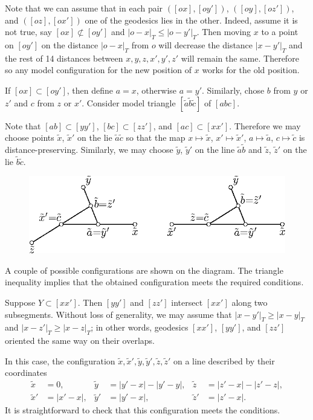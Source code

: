 \documentclass{article}
\begin{document}
Note that we can assume that in each pair $([ox],[oy'])$, $([oy],[oz'])$, and $([oz],[ox'])$ one of the geodesics lies in the other.
Indeed, assume it is not true, say $[ox]\not\subset[oy']$ and $|o-x|_T\le |o-y'|_T$.
Then moving $x$ to a point on $[oy']$ on the distance $|o-x|_T$ from $o$ will decrease the distance $|x-y'|_T$ and the rest of 14 distances between $x,y,z,x',y',z'$ will remain the same.
Therefore so any model configuration for the new position of $x$ works for the old position.

If $[ox]\subset [oy']$, then define $a=x$, otherwise $a=y'$.
Similarly, chose  $b$ from $y$ or $z'$ and $c$ from $z$ or $x'$.
Consider model triangle $[\tilde a\tilde b\tilde c]$ of $[abc]$.

Note that $[ab]\subset [yy']$, $[bc]\subset [zz']$, and $[ac]\subset [xx']$.
Therefore we may choose points $\tilde x$, $\tilde x'$ on the lie $\tilde a\tilde c$ so that the map $x\mapsto \tilde x$, $x'\mapsto \tilde x'$, $a\mapsto \tilde a$, $c\mapsto \tilde c$ is distance-preserving.
Similarly, we may choose $\tilde y$, $\tilde y'$ on the line $\tilde a\tilde b$ and $\tilde z$, $\tilde z'$ on the lie $\tilde b\tilde c$.
\begin{figure}[ht!]
\centering
\includegraphics{mppics/pic-50}
\end{figure}
A couple of possible configurations are shown on the diagram.
The triangle inequality implies that the obtained configuration meets the required conditions.

Suppose $Y\subset [xx']$.
Then $[yy']$ and $[zz']$ intersect $[xx']$ along two subsegments.
Without loss of generality, we may assume that $|x-y'|_T\ge |x-y|_T$ and $|x-z'|_T\ge |x-z|_T$;
in other words, geodesics $[xx']$, $[yy']$, and $[zz']$ oriented the same way on their overlaps.

In this case, the configuration $\tilde x,\tilde x',\tilde y,\tilde y',\tilde z,\tilde z'$ on a line described by their coordinates
\begin{align*}
\tilde x&=0,
&
\tilde y&=|y'-x|-|y'-y|,
&
\tilde z&=|z'-x|-|z'-z|,
\\
\tilde x'&=|x'-x|,
&
\tilde y'&=|y'-x|,
&
\tilde z'&=|z'-x|.
\end{align*}
It is straightforward to check that this configuration meets the conditions. 
\end{document}
